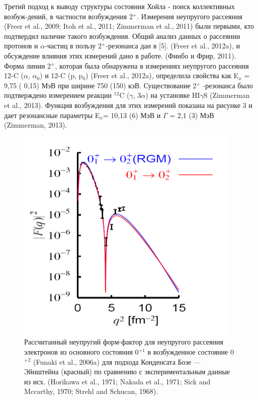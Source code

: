 \documentclass[fontsize=14pt]{scrreport}
\begin{document}
Третий подход к выводу структуры состояния Хойла - поиск коллективных возбуж-дений, в частности возбуждения 2$^{+}$. Измерения неупругого рассеяния (Freer et al., 2009; Itoh et al., 2011; Zimmerman et al., 2011) были первыми, кто подтвердил наличие такого возбуждения. Общий анализ данных о рассеянии протонов и $\alpha$-частиц в пользу 2$^{+}$-резонанса дан в [5]. (Freer et al., 2012a), и обсуждение влияния этих измерений дано в работе. (Финбо и Фрир, 2011). Форма линии 2$^{+}$, которая была обнаружена в измерениях неупругого рассеяния 12-C ($\alpha$, $\alpha_{0}$) и 12-C (p, p$_{0}$) (Freer et al., 2012a), определила свойства как E$_{x}$ = 9,75 ( 0,15) МэВ при ширине 750 (150) кэВ. Существование 2$^{+}$ -резонанса было подтверждено измерением реакции $^{12}$C ($\gamma$, 3$\alpha$) на установке HI$\gamma$S (Zimmerman et al., 2013). Функция возбуждения для этих измерений показана на рисунке 3 и дает резонансные параметры E$_{x}$= 10,13 (6) МэВ и $\Gamma$ = 2,1 (3) МэВ (Zimmerman, 2013).

\begin{figure}[!ht]
\centerline{\includegraphics[scale=.5]{picture3.png}}
\caption{Рассчитанный неупругий форм-фактор для неупругого рассеяния электронов из основного состояния 0$^{+1}$ в возбужденное состояние 0$^{+2}$ (Funaki et al., 2006a) для подхода Конденсата Бозе — Эйнштейна (красный) по сравнению с экспериментальным данные из исх. (Horikawa et al., 1971; Nakada et al., 1971; Sick and Mccarthy, 1970; Strehl and Schucan, 1968).}
\label{fig1}
\end{figure}
\end{document}
